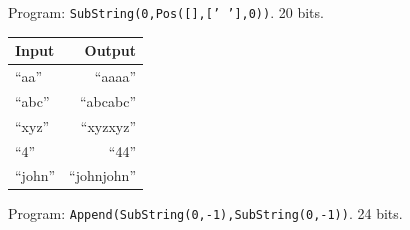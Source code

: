 \documentclass{article}
\begin{document}
Program: \texttt{SubString(0,Pos([],[' '],0))}. 20 bits.
	 \vspace{1cm}

\begin{tabular}{l|r}Input & Output \\\hline
``aa'' &	   ``aaaa''\\
 ``abc'' &	   ``abcabc''\\
 ``xyz'' &	   ``xyzxyz''\\
 ``4'' &	   ``44''\\
 ``john'' &   ``johnjohn''
\end{tabular}

Program: \texttt{Append(SubString(0,-1),SubString(0,-1))}. 24 bits.
	 \vspace{1cm}

  
{\small }



  
\end{document}
